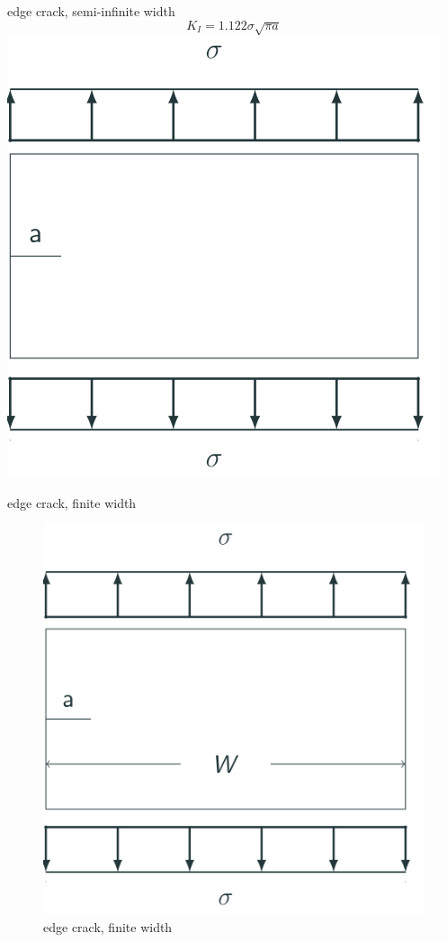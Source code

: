 \documentclass[
  letterpaper,
  ignorenonframetext,
  aspectratio=43,
  handout,
  12pt]{beamer}
\let\Oldincludegraphics\includegraphics
\renewcommand{\includegraphics}[2][]{\Oldincludegraphics[width=\textwidth,height=0.7\textheight,keepaspectratio]{#2}}
\begin{document}
\begin{frame}{edge crack, semi-infinite width}
\protect\hypertarget{edge-crack-semi-infinite-width}{}
\[K_I = 1.122 \sigma \sqrt{\pi a}\]
\includegraphics{../images/edge-infinite.svg}
\end{frame}

\begin{frame}{edge crack, finite width}
\protect\hypertarget{edge-crack-finite-width}{}
\begin{figure}
\centering
\includegraphics{../images/edge-finite.svg}
\caption{edge crack, finite width}
\end{figure}
\end{frame}
\end{document}
